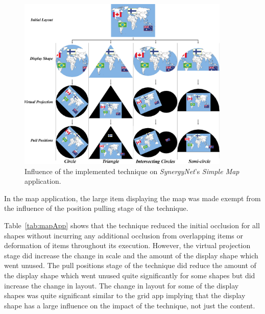 \documentclass[twocolumn,compsoc]{cvm}
\begin{document}
{\begin{figure}[p]
 \centering
  \includegraphics[width=0.9\textwidth]{figures/MapApplication.jpeg}
  \caption{Influence of the implemented technique on {\emph{SynergyNet}}'s {\emph{Simple Map}} application.}
  \label{fig:mapApp}
\end{figure}

In the map application, the large item displaying the map was made exempt from the influence of the position pulling stage of the technique.

Table~\ref{tab:mapApp} shows that the technique reduced the initial occlusion for all shapes without incurring any additional occlusion from overlapping items or deformation of items throughout its execution.
However, the virtual projection stage did increase the change in scale and the amount of the display shape which went unused.
The pull positions stage of the technique did reduce the amount of the display shape which went unused quite significantly for some shapes but did increase the change in layout.
The change in layout for some of the display shapes was quite significant similar to the grid app implying that the display shape has a large influence on the impact of the technique, not just the content.

}
\end{document}
